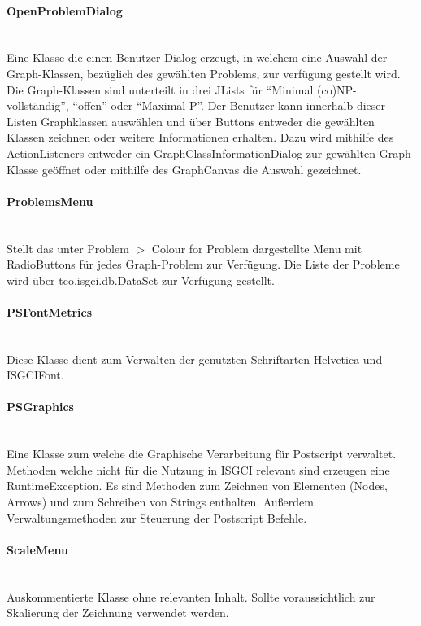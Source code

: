 \documentclass[10pt,a4paper]{article}
\begin{document}
\paragraph{OpenProblemDialog}\ \\Eine Klasse die einen Benutzer Dialog erzeugt, in welchem eine Auswahl der Graph-Klassen, bezüglich des gewählten Problems, zur verfügung gestellt wird. Die Graph-Klassen sind unterteilt in drei JLists für "`Minimal (co)NP-vollständig"', "`offen"' oder "`Maximal P"'.  Der Benutzer kann innerhalb dieser Listen Graphklassen auswählen und über Buttons entweder die gewählten Klassen zeichnen oder weitere Informationen erhalten. Dazu wird mithilfe des ActionListeners entweder ein GraphClassInformationDialog zur gewählten Graph-Klasse geöffnet oder mithilfe des GraphCanvas die Auswahl gezeichnet.

\paragraph{ProblemsMenu}\ \\Stellt das unter Problem $>$ Colour for Problem dargestellte Menu mit RadioButtons für jedes Graph-Problem zur Verfügung. Die Liste der Probleme wird über teo.isgci.db.DataSet zur Verfügung gestellt.

\paragraph{PSFontMetrics}\ \\Diese Klasse dient zum Verwalten der genutzten Schriftarten Helvetica und ISGCIFont.

\paragraph{PSGraphics}\ \\Eine Klasse zum welche die Graphische Verarbeitung für Postscript verwaltet. Methoden welche nicht für die Nutzung in ISGCI relevant sind erzeugen eine RuntimeException. Es sind Methoden zum Zeichnen von Elementen (Nodes, Arrows) und zum Schreiben von Strings enthalten. Außerdem Verwaltungsmethoden zur Steuerung der Postscript Befehle. 

\paragraph{ScaleMenu}\ \\Auskommentierte Klasse ohne relevanten Inhalt. Sollte voraussichtlich zur Skalierung der Zeichnung verwendet werden.
\end{document}
